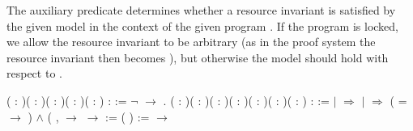 \documentclass[12pt]{report}
\begin{document}
 The auxiliary predicate  determines
    whether a resource invariant  is satisfied by the given model
    in the context of the given program . If the program is locked,
    we allow the resource invariant to be arbitrary
    (as in the proof system the resource invariant then becomes ),
    but otherwise the model should hold with respect to . \begin{coqdoccode}
\coqdocemptyline
\coqdocnoindent
{}  ( : )( : )(  : )( : )( : ) :  :=\coqdoceol
\coqdocindent{1.00em}
\ensuremath{\lnot}   \ensuremath{\rightarrow}      .\coqdoceol
\coqdocemptyline
\coqdocnoindent
{}  ( : )( : )( : )( : )( : )(  : )(  : ) :  :=\coqdoceol
\coqdocindent{1.00em}
  \coqdoceol
\coqdocindent{2.00em}
\ensuremath{|}  \ensuremath{\Rightarrow} \coqdoceol
\coqdocindent{2.00em}
\ensuremath{|}   \ensuremath{\Rightarrow}\coqdoceol
\coqdocindent{3.00em}
\coqdoceol
\coqdocindent{4.00em}
( =  \ensuremath{\rightarrow}      ) \ensuremath{\land}\coqdoceol
\coqdocindent{3.00em}
\coqdoceol
\coqdocindent{3.00em}
(\coqdockw{\ensuremath{\forall}}  ,\coqdoceol
\coqdocindent{4.00em}
   \ensuremath{\rightarrow}\coqdoceol
\coqdocindent{4.00em}
   \ensuremath{\rightarrow}\coqdoceol
\coqdocindent{3.00em}
  :=  (  ) \coqdoceol
\coqdocindent{3.00em}
  :=    \coqdoceol
\coqdocindent{4.00em}
  \ensuremath{\rightarrow}\coqdoceol

\end{coqdoccode}
\end{document}
